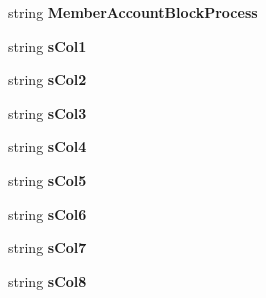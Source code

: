 \begin{DoxyCompactItemize}
\item 
string {\bfseries Member\+Account\+Block\+Process}\hypertarget{a00135_ae2aa18723e53a1c5cf471b8fc8a36fb9}{}\label{a00135_ae2aa18723e53a1c5cf471b8fc8a36fb9}

\item 
string {\bfseries s\+Col1}\hypertarget{a00135_a9a3ec9c86e64847a37b48e5ada136d41}{}\label{a00135_a9a3ec9c86e64847a37b48e5ada136d41}

\item 
string {\bfseries s\+Col2}\hypertarget{a00135_a6cd5e2afa9173a5866b24526b8de0727}{}\label{a00135_a6cd5e2afa9173a5866b24526b8de0727}

\item 
string {\bfseries s\+Col3}\hypertarget{a00135_acc918ee077f4ced4c1bd5e69cfed4e7d}{}\label{a00135_acc918ee077f4ced4c1bd5e69cfed4e7d}

\item 
string {\bfseries s\+Col4}\hypertarget{a00135_a0f2c640d13dd2e910bdb1a69937e597e}{}\label{a00135_a0f2c640d13dd2e910bdb1a69937e597e}

\item 
string {\bfseries s\+Col5}\hypertarget{a00135_a0a94e05fa70f7dbc1fea8b9cb8a984b5}{}\label{a00135_a0a94e05fa70f7dbc1fea8b9cb8a984b5}

\item 
string {\bfseries s\+Col6}\hypertarget{a00135_ae0f55785eb955632c98904a7fee6589f}{}\label{a00135_ae0f55785eb955632c98904a7fee6589f}

\item 
string {\bfseries s\+Col7}\hypertarget{a00135_aa3168d626cbe23632c33b29263ad1b5d}{}\label{a00135_aa3168d626cbe23632c33b29263ad1b5d}

\item 
string {\bfseries s\+Col8}\hypertarget{a00135_a7e1e113d456800d68b5afb774259535f}{}\label{a00135_a7e1e113d456800d68b5afb774259535f}


\end{DoxyCompactItemize}
